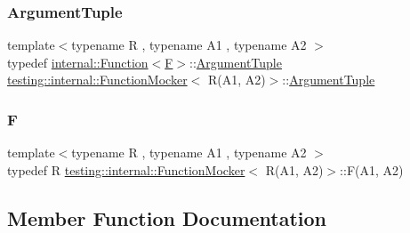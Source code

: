 \subsubsection{\texorpdfstring{Argument\+Tuple}{ArgumentTuple}}
{\footnotesize\ttfamily template$<$typename R , typename A1 , typename A2 $>$ \\
typedef \hyperlink{structtesting_1_1internal_1_1_function}{internal\+::\+Function}$<$\hyperlink{classtesting_1_1internal_1_1_function_mocker_3_01_r_07_a1_00_01_a2_08_4_a61302610bfc9b30588ea345e468310b2}{F}$>$\+::\hyperlink{classtesting_1_1internal_1_1_function_mocker_3_01_r_07_a1_00_01_a2_08_4_ae75e3ba40a99224f7363681914212c19}{Argument\+Tuple} \hyperlink{classtesting_1_1internal_1_1_function_mocker}{testing\+::internal\+::\+Function\+Mocker}$<$ R(A1, A2)$>$\+::\hyperlink{classtesting_1_1internal_1_1_function_mocker_3_01_r_07_a1_00_01_a2_08_4_ae75e3ba40a99224f7363681914212c19}{Argument\+Tuple}}

\mbox{\label{classtesting_1_1internal_1_1_function_mocker_3_01_r_07_a1_00_01_a2_08_4_a61302610bfc9b30588ea345e468310b2}} 
\subsubsection{\texorpdfstring{F}{F}}
{\footnotesize\ttfamily template$<$typename R , typename A1 , typename A2 $>$ \\
typedef R \hyperlink{classtesting_1_1internal_1_1_function_mocker}{testing\+::internal\+::\+Function\+Mocker}$<$ R(A1, A2)$>$\+::F(A1, A2)}



\subsection{Member Function Documentation}
\mbox{\label{classtesting_1_1internal_1_1_function_mocker_3_01_r_07_a1_00_01_a2_08_4_a518f5ac78887c64580343554aaae8f44}} 
